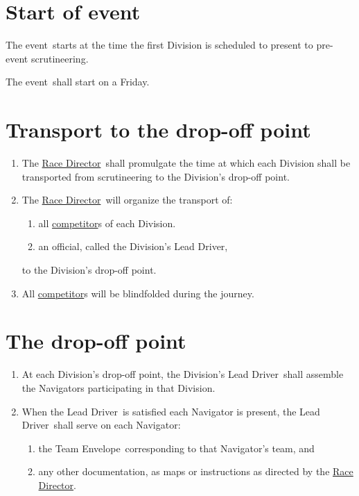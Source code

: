 \documentclass[12pt]{report}
\newcommand{\hyplink}[1]{\hyperlink{#1}{{#1}}}
\newcommand\amended{%
}
\newcommand{\competitor}{\hyplink{competitor}}
\newcommand\dropoffpoint{drop-off point}
\newcommand\Event{event}
\newcommand{\LeadDriver}{Lead Driver}
\newcommand{\RaceDirector}{\hyplink{Race Director}}
\newcommand{\TeamEnvelope}{Team Envelope}
\begin{document}
  \section{Start of event}
  \begin{fenumerate}
    \item The \Event\ starts at the time the first Division is scheduled to present to pre-event scrutineering.
    \item The \Event\ shall start on a Friday.
  \end{fenumerate}
  \section{Transport to the \dropoffpoint}
  \begin{enumerate}
    \item The \RaceDirector\ shall promulgate the time at which each Division shall be transported from scrutineering to the Division's \dropoffpoint.
    \item The \RaceDirector\ will organize the transport of:
    \begin{enumerate}
     \item all \competitor s of each Division.
     \item an official, called the Division's \LeadDriver,
    \end{enumerate}
     to the Division's \dropoffpoint.
     \item All \competitor s will be blindfolded during the journey.\amended
  \end{enumerate}
  \section{The \dropoffpoint}
  \begin{enumerate}
    \item At each Division's \dropoffpoint, the Division's \LeadDriver\ shall assemble the Navigators participating in that Division.
    \item When the \LeadDriver\ is satisfied each Navigator is present, the \LeadDriver\ shall serve on each Navigator:
        \begin{enumerate}
          \item the \TeamEnvelope\ corresponding to that Navigator's team, and
          \item any other documentation, as maps or instructions as directed by the \RaceDirector.
          \end{enumerate}
          \amended
  \end{enumerate}
\end{document}
